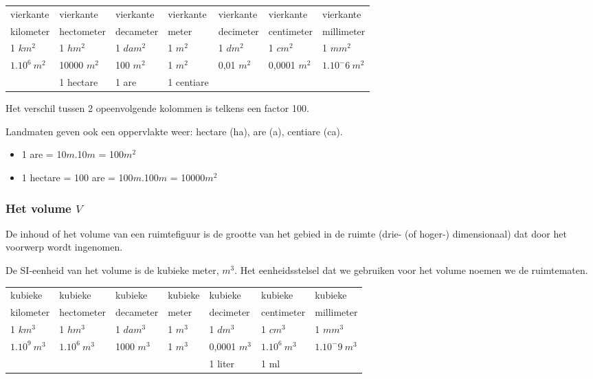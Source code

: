 \begin{center}
	\begin{tabular}{lllllll}
		vierkante & vierkante & vierkante & vierkante & vierkante & vierkante & vierkante \\
		kilometer & hectometer & decameter & meter & decimeter & centimeter & millimeter \\
		\hline
		1 $km^2$ & 1 $hm^2$ & 1 $dam^2$ & 1 $m^2$ & 1 $dm^2$ & 1 $cm^2$ & 1 $mm^2$ \\
		$1.10^6~ m^2$ & 10000 $m^2$ & 100 $m^2$ & 1 $m^2$ & 0,01 $m^2$ & 0,0001 $m^2$ & $1.10^-6 ~m^2$ \\
		& 1 hectare & 1 are & 1 centiare & & & 
	\end{tabular}
\end{center}


\begin{opmerking}
	Het verschil tussen 2 opeenvolgende kolommen is telkens een factor 100.
\end{opmerking}

Landmaten geven ook een oppervlakte weer: hectare (ha), are (a), centiare (ca).
\begin{itemize}
	\item 1 are = 10$m$.10$m$ = 100$m^2$
	\item 1 hectare = 100 are = 100$m$.100$m$ = 10000$m^2$
\end{itemize}

\subsubsection{Het volume $V$}
\begin{definitie}
	De inhoud of het volume van een ruimtefiguur is de grootte van het gebied in de ruimte (drie- (of hoger-) dimensionaal) dat door het voorwerp wordt ingenomen. 
\end{definitie}
De SI-eenheid van het volume is de kubieke meter, $m^3$. Het eenheidsstelsel dat we gebruiken voor het volume noemen we de ruimtematen.


\begin{center}
	\begin{tabular}{lllllll}
		kubieke & kubieke & kubieke & kubieke & kubieke & kubieke & kubieke \\
		kilometer & hectometer & decameter & meter & decimeter & centimeter & millimeter \\
		\hline
		1 $km^3$ & 1 $hm^3$ & 1 $dam^3$ & 1 $m^3$ & 1 $dm^3$ & 1 $cm^3$ & 1 $mm^3$ \\
		$1.10^9~ m^3$ & $1.10^6~ m^3$ & 1000 $m^3$ & 1 $m^3$ & 0,0001 $m^3$ & $1.10^6~ m^3$ & $1.10^-9 ~m^3$ \\
		&  &  &  & 1 liter & 1 ml & 
	\end{tabular}
\end{center}


